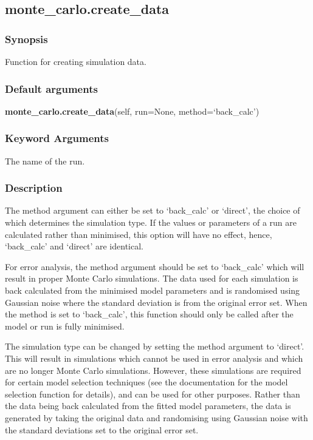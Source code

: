 


\newpage

\subsection{monte\_carlo.create\_data}


\subsubsection{Synopsis}

Function for creating simulation data.

\subsubsection{Default arguments}

\textsf{\textbf{monte\_carlo.create\_data}(self, run=None, method=`back\_calc')}


\subsubsection{Keyword Arguments}

  The name of the run.


\subsubsection{Description}

The method argument can either be set to `back\_calc' or `direct', the choice of which
determines the simulation type.  If the values or parameters of a run are calculated rather
than minimised, this option will have no effect, hence, `back\_calc' and `direct' are
identical.

For error analysis, the method argument should be set to `back\_calc' which will result in
proper Monte Carlo simulations.  The data used for each simulation is back calculated from
the minimised model parameters and is randomised using Gaussian noise where the standard
deviation is from the original error set.  When the method is set to `back\_calc', this
function should only be called after the model or run is fully minimised.

The simulation type can be changed by setting the method argument to `direct'.  This will
result in simulations which cannot be used in error analysis and which are no longer Monte
Carlo simulations.  However, these simulations are required for certain model selection
techniques (see the documentation for the model selection function for details), and can be
used for other purposes.  Rather than the data being back calculated from the fitted model
parameters, the data is generated by taking the original data and randomising using Gaussian
noise with the standard deviations set to the original error set.



